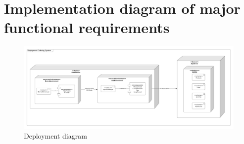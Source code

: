 \section{Implementation diagram of major functional requirements}

\begin{figure}[H]
  \centering
  \includegraphics[width=\textwidth]{./assets/t3/deployment.png}
  \caption{Deployment diagram}
\end{figure}
